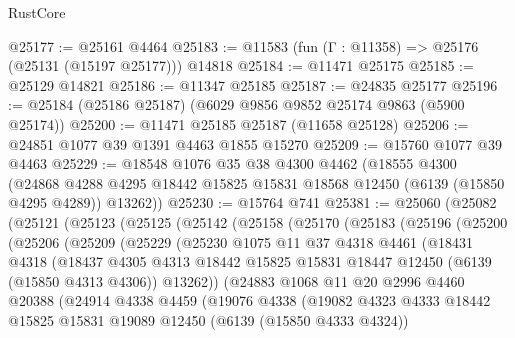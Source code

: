 \begin{lexlean}{RustCore}
\begin{coremodule}
@25177 := @25161 @4464
@25183 := @11583 (fun (Γ : @11358) => @25176 (@25131 (@15197 @25177))) @14818
@25184 := @11471 @25175
@25185 := @25129 @14821
@25186 := @11347 @25185
@25187 := @24835 @25177
@25196 := @25184 (@25186 @25187) (@6029 @9856 @9852 @25174 @9863 (@5900 @25174))
@25200 := @11471 @25185 @25187 (@11658 @25128)
@25206 := @24851 @1077 @39 @1391 @4463 @1855 @15270
@25209 := @15760 @1077 @39 @4463
@25229 := @18548
    @1076
    @35
    @38
    @4300
    @4462
    (@18555
      @4300
      (@24868 @4288 @4295 @18442 @15825 @15831 @18568 @12450 (@6139 (@15850 @4295 @4289)) @13262))
@25230 := @15764 @741
@25381 := @25060
    (@25082
      (@25121
        (@25123
          (@25125
            (@25142
              (@25158
                (@25170
                  (@25183
                    (@25196
                      (@25200
                        (@25206
                          (@25209
                            (@25229
                              (@25230
                                @1075
                                @11
                                @37
                                @4318
                                @4461
                                (@18431
                                  @4318
                                  (@18437
                                    @4305
                                    @4313
                                    @18442
                                    @15825
                                    @15831
                                    @18447
                                    @12450
                                    (@6139 (@15850 @4313 @4306))
                                    @13262))
                                (@24883
                                  @1068
                                  @11
                                  @20
                                  @2996
                                  @4460
                                  @20388
                                  (@24914
                                    @4338
                                    @4459
                                    (@19076
                                      @4338
                                      (@19082
                                        @4323
                                        @4333
                                        @18442
                                        @15825
                                        @15831
                                        @19089
                                        @12450
                                        (@6139 (@15850 @4333 @4324))

\end{coremodule}
\end{lexlean}
